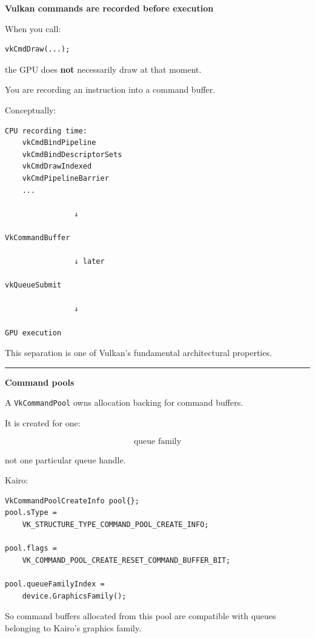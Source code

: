 \hypertarget{01-foundations-i-ch014-command-pools-command-buffers-submission-semaphores}{}

\textbf{Vulkan commands are recorded before execution}

When you call:

\begin{verbatim}
vkCmdDraw(...);
\end{verbatim}

the GPU does \textbf{not} necessarily draw at that moment.

You are recording an instruction into a command buffer.

Conceptually:

\begin{verbatim}
CPU recording time:
    vkCmdBindPipeline
    vkCmdBindDescriptorSets
    vkCmdDrawIndexed
    vkCmdPipelineBarrier
    ...

                ↓

VkCommandBuffer

                ↓ later

vkQueueSubmit

                ↓

GPU execution
\end{verbatim}

This separation is one of Vulkan's fundamental architectural properties.

\begin{center}\rule{0.5\linewidth}{0.5pt}\end{center}

\textbf{Command pools}

A \texttt{VkCommandPool} owns allocation backing for command buffers.

It is created for one:

\[
\boxed{\text{queue family}}
\]

not one particular queue handle.

Kairo:

\begin{verbatim}
VkCommandPoolCreateInfo pool{};
pool.sType =
    VK_STRUCTURE_TYPE_COMMAND_POOL_CREATE_INFO;

pool.flags =
    VK_COMMAND_POOL_CREATE_RESET_COMMAND_BUFFER_BIT;

pool.queueFamilyIndex =
    device.GraphicsFamily();
\end{verbatim}

So command buffers allocated from this pool are compatible with queues belonging to Kairo's graphics family.

